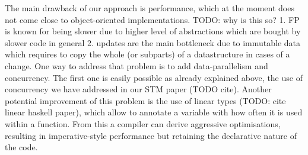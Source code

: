 The main drawback of our approach is performance, which at the moment does not come close to object-oriented implementations. TODO: why is this so? 1. FP is known for being slower due to higher level of abstractions which are bought by slower code in general 2. updates are the main bottleneck due to immutable data which requires to copy the whole (or subparts) of a datastructure in cases of a change. One way to address that problem is to add data-parallelism and concurrency. The first one is easily possible as already explained above, the use of concurrency we have addressed in our STM paper (TODO cite). Another potential improvement of this problem is the use of linear types (TODO: cite linear haskell paper), which allow to annotate a variable with how often it is used within a function. From this a compiler can derive aggressive optimisations, resulting in imperative-style performance but retaining the declarative nature of the code.